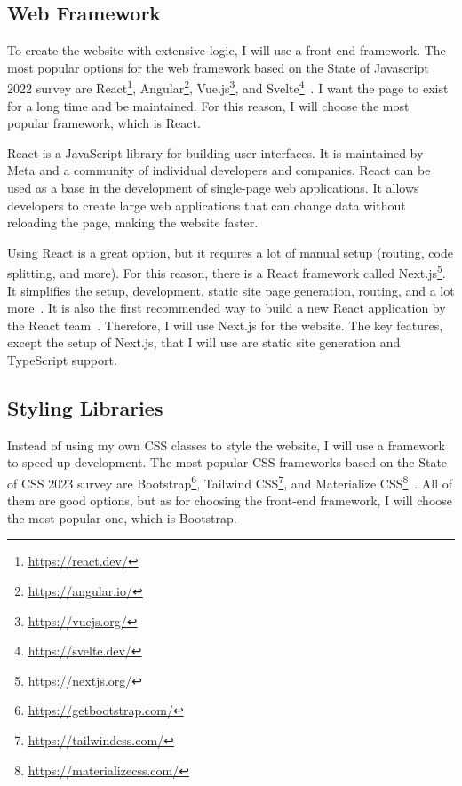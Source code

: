 \subsection{Web Framework}
To create the website with extensive logic, I will use a front-end framework.
The most popular options for the web framework based on the State of Javascript 2022 survey are React\footnote{\url{https://react.dev/}}, Angular\footnote{\url{https://angular.io/}}, Vue.js\footnote{\url{https://vuejs.org/}}, and Svelte\footnote{\url{https://svelte.dev/}}~\cite{state-of-js-frontend-frameworks}.
I want the page to exist for a long time and be maintained.
For this reason, I will choose the most popular framework, which is React.

React is a JavaScript library for building user interfaces.
It is maintained by Meta and a community of individual developers and companies.
React can be used as a base in the development of single-page web applications.
It allows developers to create large web applications that can change data without reloading the page, making the website faster.
\cite{react}

Using React is a great option, but it requires a lot of manual setup (routing, code splitting, and more).
For this reason, there is a React framework called Next.js\footnote{\url{https://nextjs.org/}}.
It simplifies the setup, development, static site page generation, routing, and a lot more~\cite{nextjs}.
It is also the first recommended way to build a new React application by the React team~\cite{react-start-new-project}.
Therefore, I will use Next.js for the website.
The key features, except the setup of Next.js, that I will use are static site generation and TypeScript support.

\subsection{Styling Libraries}
Instead of using my own CSS classes to style the website, I will use a framework to speed up development.
The most popular CSS frameworks based on the State of CSS 2023 survey are Bootstrap\footnote{\url{https://getbootstrap.com/}}, Tailwind CSS\footnote{\url{https://tailwindcss.com/}}, and Materialize CSS\footnote{\url{https://materializecss.com/}}~\cite{state-of-css-frameworks}.
All of them are good options, but as for choosing the front-end framework, I will choose the most popular one, which is Bootstrap.

